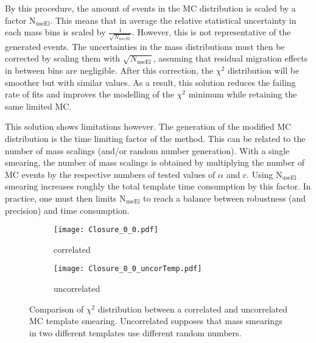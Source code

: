 By this procedure, the amount of events in the MC distribution is scaled by a factor N\(_{\text{useEl}}\).
This means that in average the relative statistical uncertainty in each mass bins is scaled by \(\frac{1}{\sqrt{N_{useEl}}}\).
However, this is not representative of the generated events.
The uncertainties in the mass distributions must then be corrected by scaling them with \(\sqrt{N_\text{useEl}}\), assuming that residual migration effects in between bins are negligible.
After this correction, the $\chi^2$ distribution will be smoother but with similar values.
As a result, this solution reduces the failing rate of fits and improves the modelling of the $\chi^2$ minimum while retaining the same limited MC.

This solution shows limitations however.
The generation of the modified MC distribution is the time limiting factor of the method.
This can be related to the number of mass scalings (and/or random number generation).
With a single smearing, the number of mass scalings is obtained by multiplying the number of MC events by the respective numbers of tested values of \(\alpha\) and c.
Using N\(_{\text{useEl}}\) smearing increases roughly the total template time consumption by this factor.
In practice, one must then limits N\(_{\text{useEl}}\) to reach a balance between robustness (and precision) and time consumption.


\begin{figure}
\begin{subfigure}[t]{0.49\linewidth}
\begin{center}
\texttt{[image: Closure\_0\_0.pdf]}
\end{center}
\caption{correlated}
\end{subfigure}
\begin{subfigure}[t]{0.49\linewidth}
\begin{center}
\texttt{[image: Closure\_0\_0\_uncorTemp.pdf]}
\end{center}
\caption{uncorrelated}
\end{subfigure}
\caption{\label{orgff6a45b}
Comparison of $\chi^2$ distribution between a correlated and uncorrelated MC template smearing. Uncorrelated supposes that mass smearings in two different templates use different random numbers.}
\end{figure}



